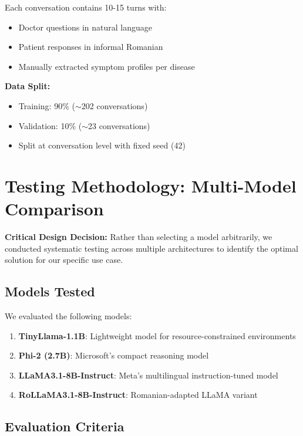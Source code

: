 \documentclass[runningheads,a4paper,11pt]{report}
\begin{document}
Each conversation contains 10-15 turns with:
\begin{itemize}
\item Doctor questions in natural language
\item Patient responses in informal Romanian
\item Manually extracted symptom profiles per disease
\end{itemize}

\textbf{Data Split:}
\begin{itemize}
\item Training: 90\% ($\sim$202 conversations)
\item Validation: 10\% ($\sim$23 conversations)
\item Split at conversation level with fixed seed (42)
\end{itemize}

\section{Testing Methodology: Multi-Model Comparison}
\label{section:testing}

\textbf{Critical Design Decision:} Rather than selecting a model arbitrarily, we conducted systematic testing across multiple architectures to identify the optimal solution for our specific use case.

\subsection{Models Tested}

We evaluated the following models:

\begin{enumerate}
\item \textbf{TinyLlama-1.1B}: Lightweight model for resource-constrained environments
\item \textbf{Phi-2 (2.7B)}: Microsoft's compact reasoning model
\item \textbf{LLaMA3.1-8B-Instruct}: Meta's multilingual instruction-tuned model
\item \textbf{RoLLaMA3.1-8B-Instruct}: Romanian-adapted LLaMA variant
\end{enumerate}

\subsection{Evaluation Criteria}
\end{document}
